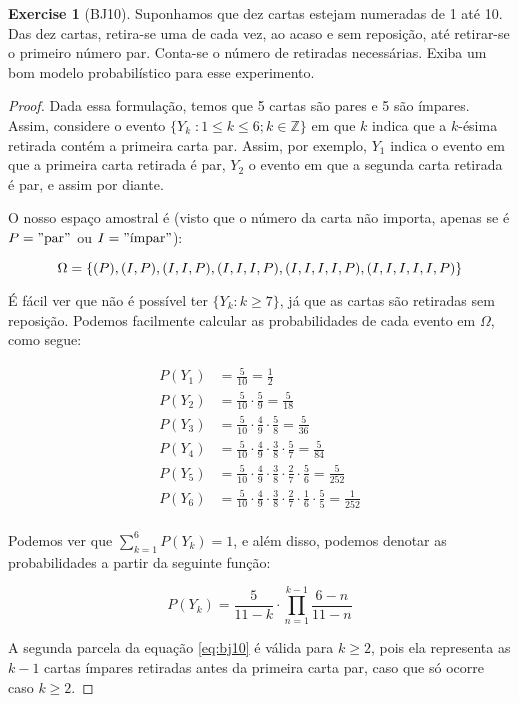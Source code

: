 \documentclass[
]{article}
\theoremstyle{definition}
\theoremstyle{definition}
\theoremstyle{definition}
\newtheorem{exercise}{Exercise}[section]
\theoremstyle{definition}
\theoremstyle{remark}
\begin{document}
\begin{exercise}[BJ10]

Suponhamos que dez cartas estejam numeradas de 1 até 10. Das dez cartas, retira-se uma de cada vez, ao acaso e sem reposição, até retirar-se o primeiro número par. Conta-se o número de retiradas necessárias. Exiba um bom modelo probabilístico para esse experimento.

\begin{proof}
Dada essa formulação, temos que 5 cartas são pares e 5 são ímpares. Assim, considere o evento \(\{Y_{k} \;: 1 \le k \le 6 ; k \in \mathbb{Z}\}\) em que \(k\) indica que a \(k\)-ésima retirada contém a primeira carta par. Assim, por exemplo, \(Y_{1}\) indica o evento em que a primeira carta retirada é par, \(Y_{2}\) o evento em que a segunda carta retirada é par, e assim por diante.

O nosso espaço amostral é (visto que o número da carta não importa, apenas se é \(P = "\text{par}"\) ou \(I = "\text{ímpar}"\)):

\begin{equation*}
\Omega = \{(P), (I,P), (I,I,P), (I,I,I,P), (I,I,I,I,P), (I,I,I,I,I,P)\}\\
\end{equation*}

É fácil ver que não é possível ter \(\{Y_{k} : k \ge 7\}\), já que as cartas são retiradas sem reposição. Podemos facilmente calcular as probabilidades de cada evento em \(\Omega\), como segue:

\begin{align*}
P(Y_{1}) &= \frac{5}{10} = \frac{1}{2}\\
P(Y_{2}) &= \frac{5}{10} \cdot \frac{5}{9}  = \frac{5}{18}\\
P(Y_{3}) &= \frac{5}{10} \cdot \frac{4}{9} \cdot \frac{5}{8} = \frac{5}{36}\\
P(Y_{4}) &= \frac{5}{10} \cdot \frac{4}{9} \cdot \frac{3}{8} \cdot \frac{5}{7} = \frac{5}{84}\\
P(Y_{5}) &= \frac{5}{10} \cdot \frac{4}{9} \cdot \frac{3}{8} \cdot \frac{2}{7} \cdot \frac{5}{6} = \frac{5}{252}\\
P(Y_{6}) &= \frac{5}{10} \cdot \frac{4}{9} \cdot \frac{3}{8} \cdot \frac{2}{7} \cdot \frac{1}{6} \cdot \frac{5}{5} = \frac{1}{252}\\
\end{align*}

Podemos ver que \(\sum_{k = 1}^{6}P(Y_{k}) = 1\), e além disso, podemos denotar as probabilidades a partir da seguinte função:

\begin{equation}
P(Y_{k}) = \frac{5}{11-k} \cdot \prod_{n=1}^{k-1} \frac{6-n}{11-n}
\label{eq:bj10}
\end{equation}

A segunda parcela da equação \eqref{eq:bj10} é válida para \(k \ge 2\), pois ela representa as \(k-1\) cartas ímpares retiradas antes da primeira carta par, caso que só ocorre caso \(k \ge 2\).
\end{proof}

\end{exercise}
\end{document}
